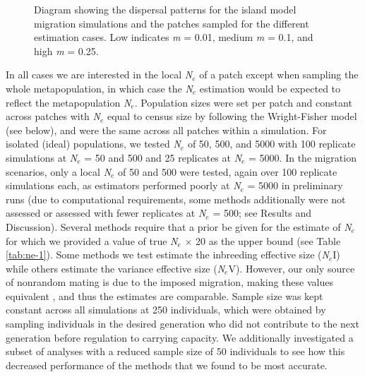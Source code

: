 \begin{figure}[]
\centering
{}
\caption[~- Diagram showing the dispersal patterns for the island model migration simulations and the patches 
sampled for the different estimation cases.]{Diagram showing the dispersal patterns for the island model migration simulations and the patches 
sampled for the different estimation cases. Low indicates \emph{m} = 0.01, medium \emph{m} = 0.1, and high \emph{m} = 0.25.}
\label{fig:ne-1}
\end{figure}

In all cases we are interested in the local \emph{N}$_e$ of a patch except when sampling 
the whole metapopulation, in which case the \emph{N}$_e$ estimation would be expected to 
reflect the metapopulation \emph{N}$_e$. Population sizes were set per patch and constant 
across patches with \emph{N}$_e$ equal to census size by following the Wright-Fisher model 
(see below), and were the same across all patches within a simulation. For isolated (ideal) 
populations, we tested \emph{N}$_e$ of 50, 500, and 5000 with 100 replicate simulations at 
\emph{N}$_e$ = 50 and 500 and 25 replicates at \emph{N}$_e$ = 5000. In the migration scenarios, 
only a local \emph{N}$_e$ of 50 and 500 were tested, again over 100 replicate simulations each, 
as estimators performed poorly at \emph{N}$_e$ = 5000 in preliminary runs (due to computational 
requirements, some methods additionally were not assessed or assessed with fewer replicates at 
\emph{N}$_e$ = 500; see Results and Discussion). Several methods require that a prior be given 
for the estimate of \emph{N}$_e$ for which we provided a value of true \emph{N}$_e$ $\times$ 20 as 
the upper bound (see Table \ref{tab:ne-1}). Some methods we test estimate the inbreeding effective size 
(\emph{N}$_e$I) while others estimate the variance effective size (\emph{N}$_e$V). However, 
our only source of nonrandom mating is due to the imposed migration, making these values 
equivalent \citep{Hill:1979}, and thus the estimates are comparable. Sample size was kept constant 
across all simulations at 250 individuals, which were obtained by sampling individuals in the 
desired generation who did not contribute to the next generation before regulation to carrying 
capacity. We additionally investigated a subset of analyses with a reduced sample size of 50 
individuals to see how this decreased performance of the methods that we found to be most accurate.

